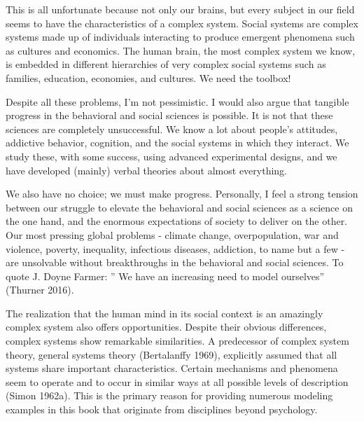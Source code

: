\documentclass[
  a4paper,
  DIV=11,
  numbers=noendperiod]{scrreprt}
\begin{document}
This is all unfortunate because not only our brains, but every subject
in our field seems to have the characteristics of a complex system.
Social systems are complex systems made up of individuals interacting to
produce emergent phenomena such as cultures and economics. The human
brain, the most complex system we know, is embedded in different
hierarchies of very complex social systems such as families, education,
economies, and cultures. We need the toolbox!

Despite all these problems, I'm not pessimistic. I would also argue that
tangible progress in the behavioral and social sciences is possible. It
is not that these sciences are completely unsuccessful. We know a lot
about people's attitudes, addictive behavior, cognition, and the social
systems in which they interact. We study these, with some success, using
advanced experimental designs, and we have developed (mainly) verbal
theories about almost everything.

We also have no choice; we must make progress. Personally, I feel a
strong tension between our struggle to elevate the behavioral and social
sciences as a science on the one hand, and the enormous expectations of
society to deliver on the other. Our most pressing global problems -
climate change, overpopulation, war and violence, poverty, inequality,
infectious diseases, addiction, to name but a few - are unsolvable
without breakthroughs in the behavioral and social sciences. To quote J.
Doyne Farmer: '' We have an increasing need to model ourselves''
(Thurner 2016).

The realization that the human mind in its social context is an
amazingly complex system also offers opportunities. Despite their
obvious differences, complex systems show remarkable similarities. A
predecessor of complex system theory, general systems theory
(Bertalanffy 1969), explicitly assumed that all systems share important
characteristics. Certain mechanisms and phenomena seem to operate and to
occur in similar ways at all possible levels of description (Simon
1962a). This is the primary reason for providing numerous modeling
examples in this book that originate from disciplines beyond psychology.
\end{document}
